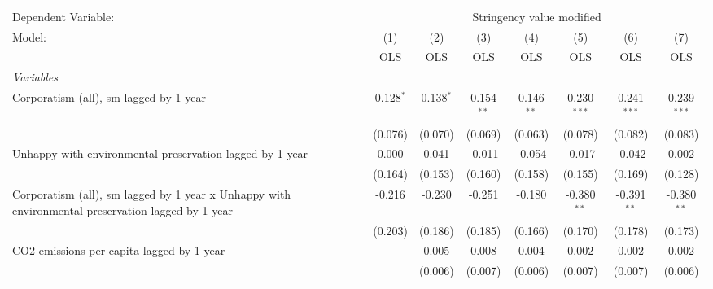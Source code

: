 
\begingroup
\centering
\begin{tabular}{lccccccc}
   \toprule
   Dependent Variable: & \multicolumn{7}{c}{Stringency value modified}\\
   Model:                                                                                            & (1)         & (2)         & (3)          & (4)            & (5)            & (6)            & (7)\\  
                                                                                                     &  OLS        & OLS         & OLS          & OLS            & OLS            & OLS            & OLS\\  
   \midrule
   \emph{Variables}\\
   Corporatism (all), sm lagged by 1 year                                                            & 0.128$^{*}$ & 0.138$^{*}$ & 0.154$^{**}$ & 0.146$^{**}$   & 0.230$^{***}$  & 0.241$^{***}$  & 0.239$^{***}$\\   
                                                                                                     & (0.076)     & (0.070)     & (0.069)      & (0.063)        & (0.078)        & (0.082)        & (0.083)\\   
   Unhappy with environmental preservation lagged by 1 year                                          & 0.000       & 0.041       & -0.011       & -0.054         & -0.017         & -0.042         & 0.002\\   
                                                                                                     & (0.164)     & (0.153)     & (0.160)      & (0.158)        & (0.155)        & (0.169)        & (0.128)\\   
   Corporatism (all), sm lagged by 1 year x Unhappy with environmental preservation lagged by 1 year & -0.216      & -0.230      & -0.251       & -0.180         & -0.380$^{**}$  & -0.391$^{**}$  & -0.380$^{**}$\\   
                                                                                                     & (0.203)     & (0.186)     & (0.185)      & (0.166)        & (0.170)        & (0.178)        & (0.173)\\   
   CO2 emissions per capita lagged by 1 year                                                         &             & 0.005       & 0.008        & 0.004          & 0.002          & 0.002          & 0.002\\   
                                                                                                     &             & (0.006)     & (0.007)      & (0.006)        & (0.007)        & (0.007)        & (0.006)\\   

\end{tabular}
